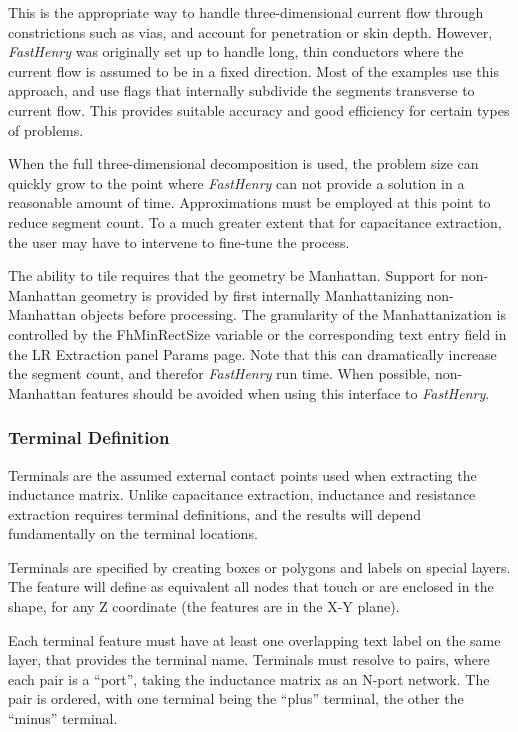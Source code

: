 This is the appropriate way to handle three-dimensional current flow
through constrictions such as vias, and account for penetration or
skin depth.  However, {\it FastHenry} was originally set up to handle
long, thin conductors where the current flow is assumed to be in a
fixed direction.  Most of the examples use this approach, and use
flags that internally subdivide the segments transverse to current
flow.  This provides suitable accuracy and good efficiency for certain
types of problems.

When the full three-dimensional decomposition is used, the problem
size can quickly grow to the point where {\it FastHenry} can not
provide a solution in a reasonable amount of time.  Approximations
must be employed at this point to reduce segment count.  To a much
greater extent that for capacitance extraction, the user may have to
intervene to fine-tune the process.

The ability to tile requires that the geometry be Manhattan.  Support
for non-Manhattan geometry is provided by first internally
Manhattanizing non-Manhattan objects before processing.  The
granularity of the Manhattanization is controlled by the {\et
FhMinRectSize} variable or the corresponding text entry field in the
{\cb LR Extraction} panel {\cb Params} page.  Note that this can
dramatically increase the segment count, and therefor {\it FastHenry}
run time.  When possible, non-Manhattan features should be avoided
when using this interface to {\it FastHenry}.

\subsubsection{Terminal Definition}

Terminals are the assumed external contact points used when extracting
the inductance matrix.  Unlike capacitance extraction, inductance and
resistance extraction requires terminal definitions, and the results
will depend fundamentally on the terminal locations.

Terminals are specified by creating boxes or polygons and labels on
special layers.  The feature will define as equivalent all nodes that
touch or are enclosed in the shape, for any Z coordinate (the features
are in the X-Y plane).

Each terminal feature must have at least one overlapping text label on
the same layer, that provides the terminal name.  Terminals must
resolve to pairs, where each pair is a ``port'', taking the inductance
matrix as an N-port network.  The pair is ordered, with one terminal
being the ``plus'' terminal, the other the ``minus'' terminal.

